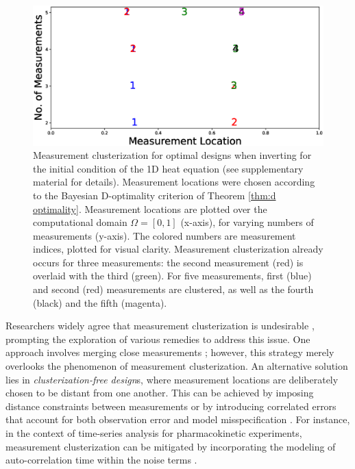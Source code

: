 \begin{figure}[H]
    \centering
    \includegraphics[height=0.5\textwidth]{example.eps}
    \caption{Measurement clusterization for optimal designs when
      inverting for the initial condition of the 1D heat equation (see
      supplementary material for details). Measurement locations were
      chosen according to the Bayesian D-optimality criterion of
      Theorem \ref{thm:d optimality}. Measurement locations are
      plotted over the computational domain $\Omega = [0, 1]$
      (x-axis), for varying numbers of measurements (y-axis). The
      colored numbers are measurement indices, plotted for visual
      clarity. Measurement clusterization already occurs for three
      measurements: the second measurement (red) is overlaid with the
      third (green). For five measurements, first (blue) and second
      (red) measurements are clustered, as well as the fourth (black)
      and the fifth (magenta).}
  \label{fig:clusterization illustration}
\end{figure}


Researchers widely agree that measurement clusterization is
undesirable \cite{fedorov1996, hooker2009, fedorov2012, Ucinski05,
  neitzel2019sparse}, prompting the exploration of various remedies to
address this issue. One approach involves merging close measurements
\cite{fedorov2012}; however, this strategy merely overlooks the
phenomenon of measurement clusterization. An alternative solution lies
in \emph{clusterization-free design}s, where measurement locations are
deliberately chosen to be distant from one another. This can be
achieved by imposing distance constraints between measurements or by
introducing correlated errors that account for both observation error
and model misspecification \cite{Ucinski05}. For instance, in the
context of time-series analysis for pharmacokinetic experiments,
measurement clusterization can be mitigated by incorporating the
modeling of auto-correlation time within the noise terms
\cite{hooker2009}.


